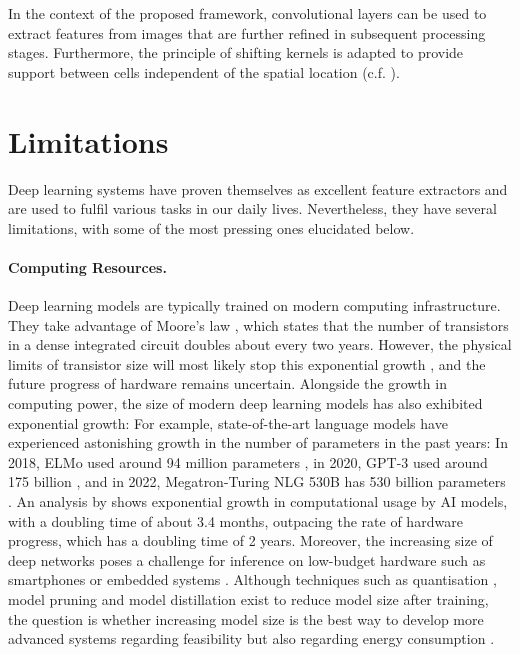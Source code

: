 In the context of the proposed framework, convolutional layers can be used to extract features from images that are further refined in subsequent processing stages.
Furthermore, the principle of shifting kernels is adapted to provide support between cells independent of the spatial location (c.f. ).


\section{Limitations}
Deep learning systems have proven themselves as excellent feature extractors and are used to fulfil various tasks in our daily lives.
Nevertheless, they have several limitations, with some of the most pressing ones elucidated below.

\paragraph{Computing Resources.} Deep learning models are typically trained on modern computing infrastructure. They take advantage of Moore's law , which states that the number of transistors in a dense integrated circuit doubles about every two years. However, the physical limits of transistor size will most likely stop this exponential growth , and the future progress of hardware remains uncertain.
Alongside the growth in computing power, the size of modern deep learning models has also exhibited exponential growth:
For example, state-of-the-art language models have experienced astonishing growth in the number of parameters in the past years: In 2018, ELMo used around 94 million parameters , in 2020, GPT-3 used around 175 billion , and in 2022, Megatron-Turing NLG 530B has 530 billion parameters .
An analysis by  shows exponential growth in computational usage by AI models, with a doubling time of about 3.4 months, outpacing the rate of hardware progress, which has a doubling time of 2 years. Moreover, the increasing size of deep networks poses a challenge for inference on low-budget hardware such as smartphones or embedded systems . Although techniques such as quantisation , model pruning  and model distillation  exist to reduce model size after training, the question is whether increasing model size is the best way to develop more advanced systems regarding feasibility but also regarding energy consumption \cite{garcia-martin_estimation_2019}.


